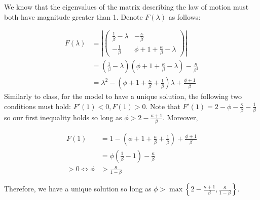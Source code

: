 \documentclass[11pt]{article} %
\begin{document}
We know that the eigenvalues of the matrix describing the law of motion must both have magnitude greater than 1. Denote $F(\lambda)$ as follows:

\begin{align*}
F(\lambda)  &= \left|  \begin{pmatrix} \frac{1}{\beta} - \lambda &  -\frac{\kappa }{\beta}  \\ -\frac{1}{\beta}  & \phi + 1 + \frac{\kappa}{\beta} - \lambda  \end{pmatrix} \right|\\
&= \left(  \frac{1 }{\beta} - \lambda \right) \left( \phi + 1 + \frac{\kappa}{\beta} - \lambda \right) - \frac{\kappa}{\beta^2} \\
&= \lambda^2 - \left( \phi + 1 + \frac{\kappa}{\beta} + \frac{1}{\beta}\right)\lambda + \frac{ \phi + 1 }{\beta}
\end{align*}
 Similarly to class, for the model to have a unique solution, the following two conditions must hold: $F'(1)<0, F(1) > 0$. Note that $F'(1)  = 2  - \phi - \frac{\kappa}{\beta} - \frac{1}{\beta} $ so our first inequality holds so long as $\phi>2 - \frac{\kappa + 1}{\beta}$. Moreover,

\begin{align*}
F(1) &=  1 - \left(\phi + 1 + \frac{\kappa}{\beta} + \frac{1}{\beta}\right) + \frac{ \phi + 1 }{\beta} \\
&= \phi \left( \frac{1}{\beta} - 1\right) - \frac{\kappa}{\beta}\\
>0 \iff \phi &> \frac{\kappa}{1-\beta}
\end{align*}

Therefore, we have a unique solution so long as $\phi > \max\left\{ 2 - \frac{\kappa + 1}{\beta} ,  \frac{\kappa}{1-\beta}\right\}$.
\end{document}
